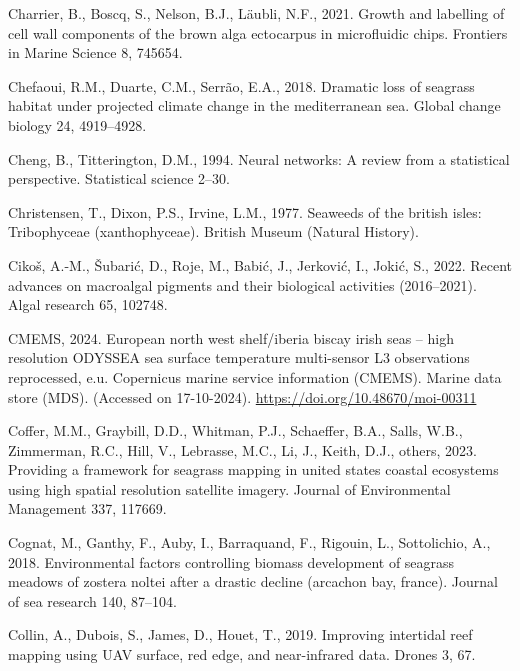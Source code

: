 \documentclass[
  letterpaper,
  11pt,
  english,
  singlespacing,
  headsepline]{MastersDoctoralThesis}
\newlength{\cslhangindent}
\newenvironment{CSLReferences}[2] %
 {\begin{list}{}{%
  \setlength{\itemindent}{0pt}
  \setlength{\leftmargin}{0pt}
  \setlength{\parsep}{0pt}
  \ifodd #1
   \setlength{\leftmargin}{\cslhangindent}
   \setlength{\itemindent}{-1\cslhangindent}
  \fi
  \setlength{\itemsep}{#2\baselineskip}}}
 {\end{list}}
\begin{document}
\begin{CSLReferences}{1}{0}
Charrier, B., Boscq, S., Nelson, B.J., Läubli, N.F., 2021. Growth and
labelling of cell wall components of the brown alga ectocarpus in
microfluidic chips. Frontiers in Marine Science 8, 745654.

Chefaoui, R.M., Duarte, C.M., Serrão, E.A., 2018. Dramatic loss of
seagrass habitat under projected climate change in the mediterranean
sea. Global change biology 24, 4919--4928.

Cheng, B., Titterington, D.M., 1994. Neural networks: A review from a
statistical perspective. Statistical science 2--30.

Christensen, T., Dixon, P.S., Irvine, L.M., 1977. Seaweeds of the
british isles: Tribophyceae (xanthophyceae). British Museum (Natural
History).

Cikoš, A.-M., Šubarić, D., Roje, M., Babić, J., Jerković, I., Jokić, S.,
2022. Recent advances on macroalgal pigments and their biological
activities (2016--2021). Algal research 65, 102748.

CMEMS, 2024. European north west shelf/iberia biscay irish seas -- high
resolution ODYSSEA sea surface temperature multi-sensor L3 observations
reprocessed, e.u. Copernicus marine service information (CMEMS). Marine
data store (MDS). (Accessed on 17-10-2024).
\url{https://doi.org/10.48670/moi-00311}

Coffer, M.M., Graybill, D.D., Whitman, P.J., Schaeffer, B.A., Salls,
W.B., Zimmerman, R.C., Hill, V., Lebrasse, M.C., Li, J., Keith, D.J.,
others, 2023. Providing a framework for seagrass mapping in united
states coastal ecosystems using high spatial resolution satellite
imagery. Journal of Environmental Management 337, 117669.

Cognat, M., Ganthy, F., Auby, I., Barraquand, F., Rigouin, L.,
Sottolichio, A., 2018. Environmental factors controlling biomass
development of seagrass meadows of zostera noltei after a drastic
decline (arcachon bay, france). Journal of sea research 140, 87--104.

Collin, A., Dubois, S., James, D., Houet, T., 2019. Improving intertidal
reef mapping using UAV surface, red edge, and near-infrared data. Drones
3, 67.


\end{CSLReferences}
\end{document}
